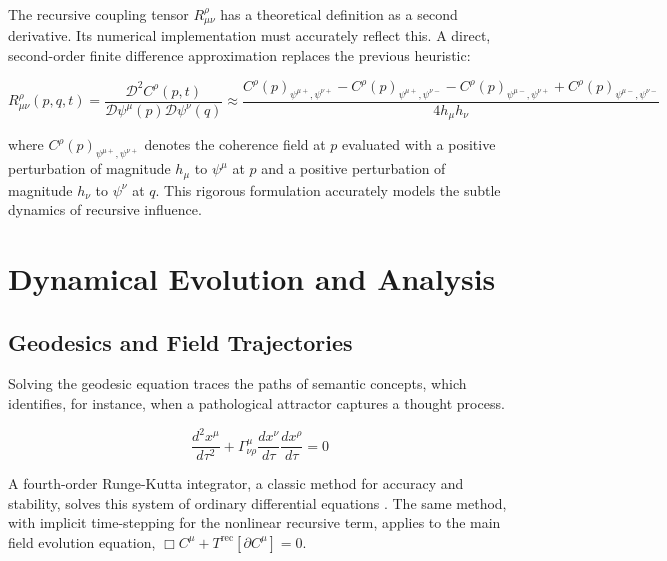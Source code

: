 The recursive coupling tensor \(R^\rho_{\mu\nu}\) has a theoretical definition as a second derivative. Its numerical implementation must accurately reflect this. A direct, second-order finite difference approximation replaces the previous heuristic:

\begin{equation}
R^\rho_{\mu\nu}(p,q,t) = \frac{\mathcal{D}^2 C^\rho(p,t)}{\mathcal{D} \psi^\mu(p) \mathcal{D} \psi^\nu(q)} \approx \frac{C^\rho(p)_{\psi^{\mu+},\psi^{\nu+}} - C^\rho(p)_{\psi^{\mu+},\psi^{\nu-}} - C^\rho(p)_{\psi^{\mu-},\psi^{\nu+}} + C^\rho(p)_{\psi^{\mu-},\psi^{\nu-}}}{4h_\mu h_\nu}
\end{equation}

where \(C^\rho(p)_{\psi^{\mu+},\psi^{\nu+}}\) denotes the coherence field at \(p\) evaluated with a positive perturbation of magnitude \(h_\mu\) to \(\psi^\mu\) at \(p\) and a positive perturbation of magnitude \(h_\nu\) to \(\psi^\nu\) at \(q\). This rigorous formulation accurately models the subtle dynamics of recursive influence.


\section{Dynamical Evolution and Analysis}
\label{17.3:dynamical_evolution_and_analysis}


\subsection{Geodesics and Field Trajectories}
\label{17.3.1:geodesics_and_field_trajectories}

Solving the geodesic equation traces the paths of semantic concepts, which identifies, for instance, when a pathological attractor captures a thought process.

\begin{equation}
\frac{d^2 x^{\mu}}{d\tau^2} + \Gamma^{\mu}_{\nu\rho} \frac{dx^{\nu}}{d\tau} \frac{dx^{\rho}}{d\tau} = 0
\end{equation}

A fourth-order Runge-Kutta integrator, a classic method for accuracy and stability, solves this system of ordinary differential equations \autocite{Runge1895, Kutta1901}. The same method, with implicit time-stepping for the nonlinear recursive term, applies to the main field evolution equation, \(\Box C^\mu + T^{\text{rec}}[\partial C^\mu] = 0\).

